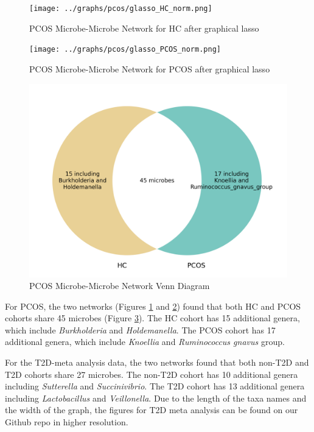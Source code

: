 \documentclass[12pt,letterpaper]{article}
\begin{document}
\begin{figure}[h!]
  \centering
  \texttt{[image: ../graphs/pcos/glasso\_HC\_norm.png]}
  \caption{PCOS Microbe-Microbe Network for HC after graphical lasso}
  \label{fig:pcosglassoHCnorm}
\end{figure}

\begin{figure}[h!]
  \centering
  \texttt{[image: ../graphs/pcos/glasso\_PCOS\_norm.png]}
  \caption{PCOS Microbe-Microbe Network for PCOS after graphical lasso}
  \label{fig:pcosglassoPCOSnorm}
\end{figure}

\begin{figure}[h!]
  \centering
  \includegraphics[width=0.8\linewidth]{../poster/pcos_microbe_microbe_venn.png}
  \caption{PCOS Microbe-Microbe Network Venn Diagram}
  \label{fig:pcosglassovenn}
\end{figure}

For PCOS, the two networks (Figures \ref{fig:pcosglassoHCnorm} and \ref{fig:pcosglassoPCOSnorm}) found that both HC and PCOS cohorts share 45 microbes (Figure \ref{fig:pcosglassovenn}). The HC cohort has 15 additional genera, which include \textit{Burkholderia} and \textit{Holdemanella}. The PCOS cohort has 17 additional genera, which include \textit{Knoellia} and \textit{Ruminococcus gnavus} group. 

For the T2D-meta analysis data, the two networks found that both non-T2D and T2D cohorts share 27 microbes. The non-T2D cohort has 10 additional genera including \textit{Sutterella} and \textit{Succinivibrio}. The T2D cohort has 13 additional genera including \textit{Lactobacillus} and \textit{Veillonella}. Due to the length of the taxa names and the width of the graph, the figures for T2D meta analysis can be found on our Github repo in higher resolution. 
\end{document}
